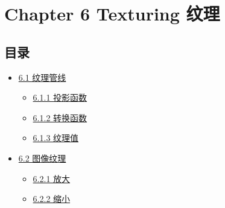 \documentclass[
  paper=a4,
  ,captions=tableheading
]{scrartcl}
\author{}
\date{}
\title{}
\author{}
\date{}
\providecommand{\tightlist}{%
  \setlength{\itemsep}{0pt}\setlength{\parskip}{0pt}}
\begin{document}
\section{Chapter 6 Texturing
  纹理}\label{chapter-6-texturing-ux7eb9ux7406}

\subsection{目录}\label{ux76eeux5f55}

\begin{itemize}
  \tightlist
  \item
        \hyperref[61-ux7eb9ux7406ux7ba1ux7ebf]{6.1 纹理管线}

        \begin{itemize}
          \tightlist
          \item
                \hyperref[611-ux6295ux5f71ux51fdux6570]{6.1.1 投影函数}
          \item
                \hyperref[612-ux8f6cux6362ux51fdux6570]{6.1.2 转换函数}
          \item
                \hyperref[613-ux7eb9ux7406ux503c]{6.1.3 纹理值}
        \end{itemize}
  \item
        \hyperref[62-ux56feux50cfux7eb9ux7406]{6.2 图像纹理}

        \begin{itemize}
          \tightlist
          \item
                \hyperref[621-ux653eux5927]{6.2.1 放大}
          \item
                \hyperref[622-ux7f29ux5c0f]{6.2.2 缩小}


\end{itemize}
\end{itemize}
\end{document}

